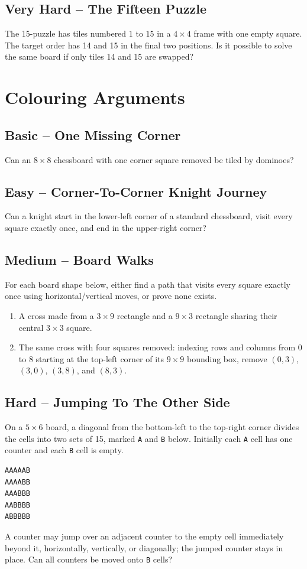 \documentclass[12pt]{article}
\begin{document}
\subsection*{Very Hard -- The Fifteen Puzzle}
The 15-puzzle has tiles numbered $1$ to $15$ in a $4\times4$ frame
with one empty square. The target order has 14 and 15 in the final
two positions. Is it possible to solve the same board if only tiles
14 and 15 are swapped?

\section{Colouring Arguments}

\subsection*{Basic -- One Missing Corner}
Can an $8\times8$ chessboard with one corner square removed be tiled
by dominoes?

\subsection*{Easy -- Corner-To-Corner Knight Journey}
Can a knight start in the lower-left corner of a standard chessboard,
visit every square exactly once, and end in the upper-right corner?

\subsection*{Medium -- Board Walks}
For each board shape below, either find a path that visits every
square exactly once using horizontal/vertical moves, or prove none exists.
\begin{enumerate}[label=(\alph*)]
    \item A cross made from a $3\times9$ rectangle and a $9\times3$
        rectangle sharing their central $3\times3$ square.
    \item The same cross with four squares removed: indexing rows and
        columns from 0 to 8 starting at the top-left corner of its
        $9\times9$ bounding box, remove $(0,3)$, $(3,0)$, $(3,8)$,
        and $(8,3)$.
\end{enumerate}

\subsection*{Hard -- Jumping To The Other Side}
On a $5\times6$ board, a diagonal from the bottom-left to the
top-right corner divides the cells into two sets of 15, marked
\texttt{A} and \texttt{B} below. Initially each \texttt{A} cell has
one counter and each \texttt{B} cell is empty.
\begin{center}
\begin{verbatim}
AAAAAB
AAAABB
AAABBB
AABBBB
ABBBBB
\end{verbatim}
\end{center}
A counter may jump over an adjacent counter to the empty cell
immediately beyond it, horizontally, vertically, or diagonally;
the jumped counter stays in place. Can all counters be moved onto
\texttt{B} cells?
\end{document}
